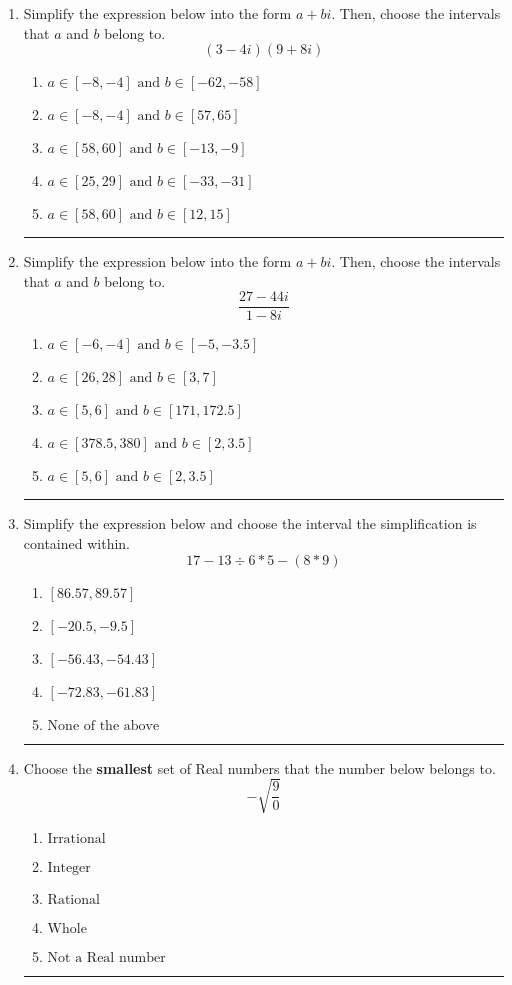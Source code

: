 \documentclass[14pt]{extbook}
\newcommand{\litem}[1]{\item#1\hspace*{-1cm}\rule{\textwidth}{0.4pt}}
\begin{document}
\begin{enumerate}
{\begin{enumerate}[label=\Alph*.]
\end{enumerate} }
\litem{
Simplify the expression below into the form $a+bi$. Then, choose the intervals that $a$ and $b$ belong to.\[ (3 - 4 i)(9 + 8 i) \]\begin{enumerate}[label=\Alph*.]
\item \( a \in [-8, -4] \text{ and } b \in [-62, -58] \)
\item \( a \in [-8, -4] \text{ and } b \in [57, 65] \)
\item \( a \in [58, 60] \text{ and } b \in [-13, -9] \)
\item \( a \in [25, 29] \text{ and } b \in [-33, -31] \)
\item \( a \in [58, 60] \text{ and } b \in [12, 15] \)

\end{enumerate} }
\litem{
Simplify the expression below into the form $a+bi$. Then, choose the intervals that $a$ and $b$ belong to.\[ \frac{27 - 44 i}{1 - 8 i} \]\begin{enumerate}[label=\Alph*.]
\item \( a \in [-6, -4] \text{ and } b \in [-5, -3.5] \)
\item \( a \in [26, 28] \text{ and } b \in [3, 7] \)
\item \( a \in [5, 6] \text{ and } b \in [171, 172.5] \)
\item \( a \in [378.5, 380] \text{ and } b \in [2, 3.5] \)
\item \( a \in [5, 6] \text{ and } b \in [2, 3.5] \)

\end{enumerate} }
\litem{
Simplify the expression below and choose the interval the simplification is contained within.\[ 17 - 13 \div 6 * 5 - (8 * 9) \]\begin{enumerate}[label=\Alph*.]
\item \( [86.57, 89.57] \)
\item \( [-20.5, -9.5] \)
\item \( [-56.43, -54.43] \)
\item \( [-72.83, -61.83] \)
\item \( \text{None of the above} \)

\end{enumerate} }
\litem{
Choose the \textbf{smallest} set of Real numbers that the number below belongs to.\[ -\sqrt{\frac{9}{0}} \]\begin{enumerate}[label=\Alph*.]
\item \( \text{Irrational} \)
\item \( \text{Integer} \)
\item \( \text{Rational} \)
\item \( \text{Whole} \)
\item \( \text{Not a Real number} \)


\end{enumerate}}
\end{enumerate}
\end{document}
